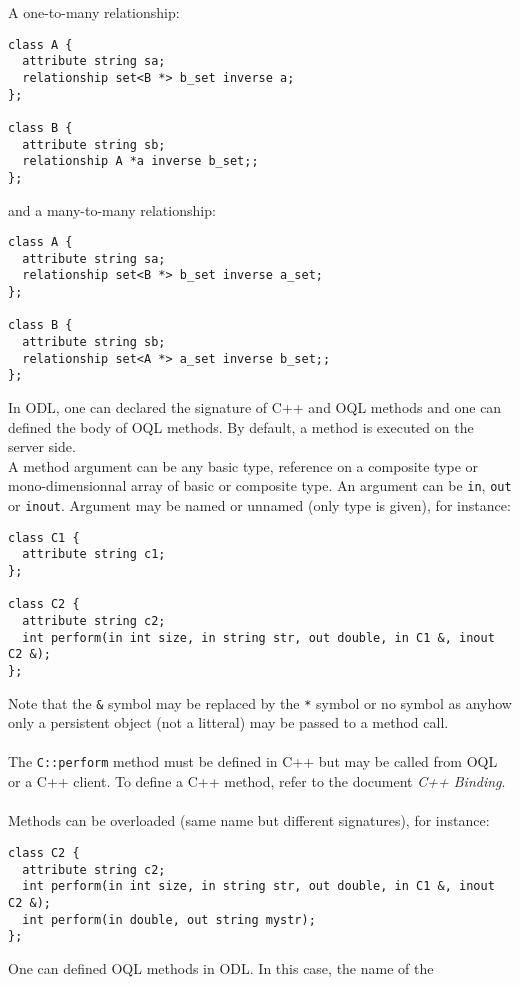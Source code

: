 A one-to-many relationship:
\vspace{-0.2cm}
\begin{verbatim}
class A {
  attribute string sa;
  relationship set<B *> b_set inverse a;
};

class B {
  attribute string sb;
  relationship A *a inverse b_set;;
};
\end{verbatim}
and a many-to-many relationship:
\vspace{-0.2cm}
\begin{verbatim}
class A {
  attribute string sa;
  relationship set<B *> b_set inverse a_set;
};

class B {
  attribute string sb;
  relationship set<A *> a_set inverse b_set;;
};
\end{verbatim}

In ODL, one can declared the signature of C++ and OQL methods
and one can defined the body of OQL methods.
By default, a method is executed on the server side.
\\
A method argument can be any basic type, reference on a composite type or
mono-dimensionnal array of basic or composite type. An argument
can be \texttt{in}, \texttt{out} or \texttt{inout}.
Argument may be named or unnamed (only type is given), for instance:
\vspace{-0.2cm}
\begin{verbatim}
class C1 {
  attribute string c1;
};

class C2 {
  attribute string c2;
  int perform(in int size, in string str, out double, in C1 &, inout C2 &);
};
\end{verbatim}
Note that the \texttt{\&} symbol may be replaced by the \texttt{*} symbol
or no symbol as anyhow only a persistent object (not a litteral) may
be passed to a method call.
\\
\\
The \texttt{C::perform} method must be defined in C++ but may be called
from OQL or a C++ client. To define a C++ method, refer to the
document \emph{C++ Binding}.
\\
\\
Methods can be overloaded (same name but different signatures), for instance:
\vspace{-0.2cm}
\begin{verbatim}
class C2 {
  attribute string c2;
  int perform(in int size, in string str, out double, in C1 &, inout C2 &);
  int perform(in double, out string mystr);
};
\end{verbatim}
One can defined OQL methods in ODL. In this case, the name of the
